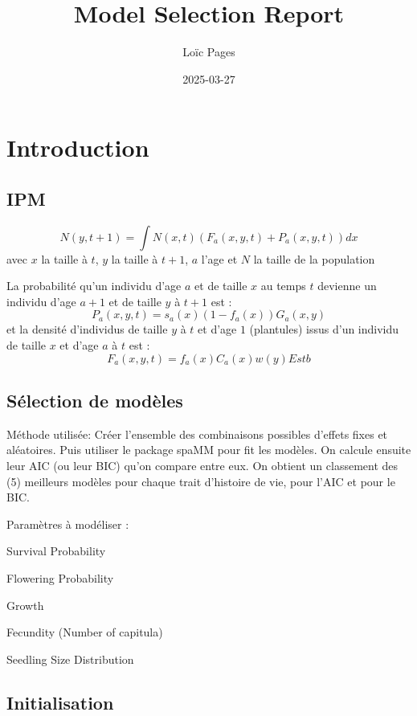 \documentclass[
]{article}
\title{Model Selection Report}
\author{Loïc Pages}
\date{2025-03-27}
\begin{document}
\maketitle

\section{Introduction}\label{introduction}

\subsection{IPM}\label{ipm}

\[N(y,t+1)=\int N(x,t)(F_a(x,y,t)+P_a(x,y,t))dx\] avec \(x\) la taille à
\(t\), \(y\) la taille à \(t+1\), \(a\) l'age et \(N\) la taille de la
population

La probabilité qu'un individu d'age \(a\) et de taille \(x\) au temps
\(t\) devienne un individu d'age \(a+1\) et de taille \(y\) à \(t+1\)
est : \[P_a(x,y,t)=s_a(x)(1-f_a(x))G_a(x,y)\] et la densité d'individus
de taille \(y\) à \(t\) et d'age \(1\) (plantules) issus d'un individu
de taille \(x\) et d'age \(a\) à \(t\) est :
\[F_a(x,y,t)=f_a(x)C_a(x)w(y)Estb\]

\subsection{Sélection de modèles}\label{suxe9lection-de-moduxe8les}

Méthode utilisée: Créer l'ensemble des combinaisons possibles d'effets
fixes et aléatoires. Puis utiliser le package spaMM pour fit les
modèles. On calcule ensuite leur AIC (ou leur BIC) qu'on compare entre
eux. On obtient un classement des (5) meilleurs modèles pour chaque
trait d'histoire de vie, pour l'AIC et pour le BIC.

Paramètres à modéliser :

Survival Probability

Flowering Probability

Growth

Fecundity (Number of capitula)

Seedling Size Distribution

\subsection{Initialisation}\label{initialisation}
\end{document}
